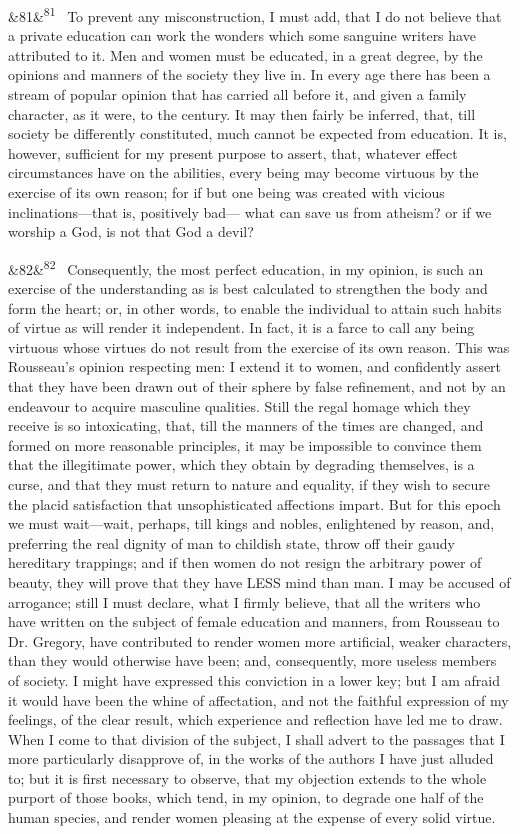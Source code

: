 \documentclass[12pt]{article}
\newcommand{\para}[1][]{\par\noindent\ifx&#1&\else\textsuperscript{\footnotesize #1}~\fi}
\begin{document}
\para[81] To prevent any misconstruction, I must add, that I do not believe that a private education can work the wonders which some sanguine writers have attributed to it. Men and women must be educated, in a great degree, by the opinions and manners of the society they live in. In every age there has been a stream of popular opinion that has carried all before it, and given a family character, as it were, to the century. It may then fairly be inferred, that, till society be differently constituted, much cannot be expected from education. It is, however, sufficient for my present purpose to assert, that, whatever effect circumstances have on the abilities, every being may become virtuous by the exercise of its own reason; for if but one being was created with vicious inclinations---that is, positively bad--- what can save us from atheism? or if we worship a God, is not that God a devil?

\para[82] Consequently, the most perfect education, in my opinion, is such an exercise of the understanding as is best calculated to strengthen the body and form the heart; or, in other words, to enable the individual to attain such habits of virtue as will render it independent. In fact, it is a farce to call any being virtuous whose virtues do not result from the exercise of its own reason. This was Rousseau's opinion respecting men: I extend it to women, and confidently assert that they have been drawn out of their sphere by false refinement, and not by an endeavour to acquire masculine qualities. Still the regal homage which they receive is so intoxicating, that, till the manners of the times are changed, and formed on more reasonable principles, it may be impossible to convince them that the illegitimate power, which they obtain by degrading themselves, is a curse, and that they must return to nature and equality, if they wish to secure the placid satisfaction that unsophisticated affections impart. But for this epoch we must wait---wait, perhaps, till kings and nobles, enlightened by reason, and, preferring the real dignity of man to childish state, throw off their gaudy hereditary trappings; and if then women do not resign the arbitrary power of beauty, they will prove that they have LESS mind than man. I may be accused of arrogance; still I must declare, what I firmly believe, that all the writers who have written on the subject of female education and manners, from Rousseau to Dr. Gregory, have contributed to render women more artificial, weaker characters, than they would otherwise have been; and, consequently, more useless members of society. I might have expressed this conviction in a lower key; but I am afraid it would have been the whine of affectation, and not the faithful expression of my feelings, of the clear result, which experience and reflection have led me to draw. When I come to that division of the subject, I shall advert to the passages that I more particularly disapprove of, in the works of the authors I have just alluded to; but it is first necessary to observe, that my objection extends to the whole purport of those books, which tend, in my opinion, to degrade one half of the human species, and render women pleasing at the expense of every solid virtue.
\end{document}
